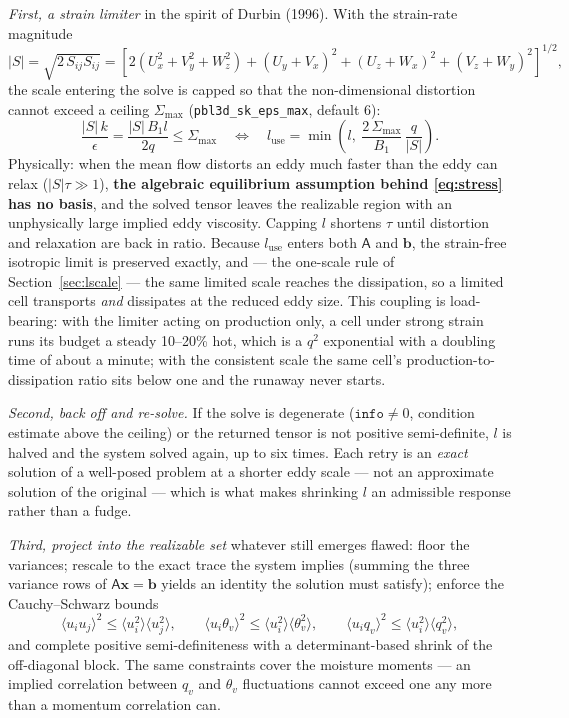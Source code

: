 \documentclass[10pt,a4paper]{article}
\newcommand{\keytag}[1]{\colorbox{keyc}{\textcolor{white}{\sffamily\bfseries\scriptsize K#1}}}
\newcommand{\key}[1]{\marginpar[\raggedleft\keytag{#1}]{\raggedright\keytag{#1}}\ignorespaces}
\newcommand{\kh}[1]{{\color{keyc!80!black}\bfseries #1}}
\newcommand{\avg}[1]{\langle #1 \rangle}
\begin{document}
\emph{First, a strain limiter} in the spirit of Durbin (1996). With the strain-rate magnitude
\begin{equation}
|S| = \sqrt{2\, S_{ij} S_{ij}}
    = \left[ 2\!\left( U_x^2 + V_y^2 + W_z^2 \right)
      + \left( U_y{+}V_x \right)^2 + \left( U_z{+}W_x \right)^2 + \left( V_z{+}W_y \right)^2 \right]^{1/2},
\end{equation}
the scale entering the solve is capped so that the non-dimensional distortion cannot exceed a ceiling $\Sigma_{\max}$ (\texttt{pbl3d\_sk\_eps\_max}, default 6):
\begin{equation}
\frac{|S|\,k}{\epsilon} = \frac{|S|\, B_1 l}{2 q} \le \Sigma_{\max}
\quad\Longleftrightarrow\quad
l_\mathrm{use} = \min\!\left( l,\ \frac{2\,\Sigma_{\max}}{B_1}\,\frac{q}{|S|} \right).
\label{eq:tier1}
\end{equation}
\key{5}Physically: when the mean flow distorts an eddy much faster than the eddy can relax ($|S|\tau \gg 1$), \kh{the algebraic equilibrium assumption behind \eqref{eq:stress} has no basis}, and the solved tensor leaves the realizable region with an unphysically large implied eddy viscosity. Capping $l$ shortens $\tau$ until distortion and relaxation are back in ratio. Because $l_\mathrm{use}$ enters both $\mathsf{A}$ and $\mathbf{b}$, the strain-free isotropic limit is preserved exactly, and — the one-scale rule of Section~\ref{sec:lscale} — the same limited scale reaches the dissipation, so a limited cell transports \emph{and} dissipates at the reduced eddy size. This coupling is load-bearing: with the limiter acting on production only, a cell under strong strain runs its budget a steady 10--20\% hot, which is a $q^2$ exponential with a doubling time of about a minute; with the consistent scale the same cell's production-to-dissipation ratio sits below one and the runaway never starts.

\emph{Second, back off and re-solve.} If the solve is degenerate ($\texttt{info} \neq 0$, condition estimate above the ceiling) or the returned tensor is not positive semi-definite, $l$ is halved and the system solved again, up to six times. Each retry is an \emph{exact} solution of a well-posed problem at a shorter eddy scale — not an approximate solution of the original — which is what makes shrinking $l$ an admissible response rather than a fudge.

\emph{Third, project into the realizable set} whatever still emerges flawed: floor the variances; rescale to the exact trace the system implies (summing the three variance rows of $\mathsf{A}\mathbf{x}=\mathbf{b}$ yields an identity the solution must satisfy); enforce the Cauchy--Schwarz bounds
\begin{equation}
\avg{u_i u_j}^2 \le \avg{u_i^2}\avg{u_j^2},
\qquad
\avg{u_i \theta_v}^2 \le \avg{u_i^2}\avg{\theta_v^2},
\qquad
\avg{u_i q_v}^2 \le \avg{u_i^2}\avg{q_v^2},
\end{equation}
and complete positive semi-definiteness with a determinant-based shrink of the off-diagonal block. The same constraints cover the moisture moments — an implied correlation between $q_v$ and $\theta_v$ fluctuations cannot exceed one any more than a momentum correlation can.
\end{document}
